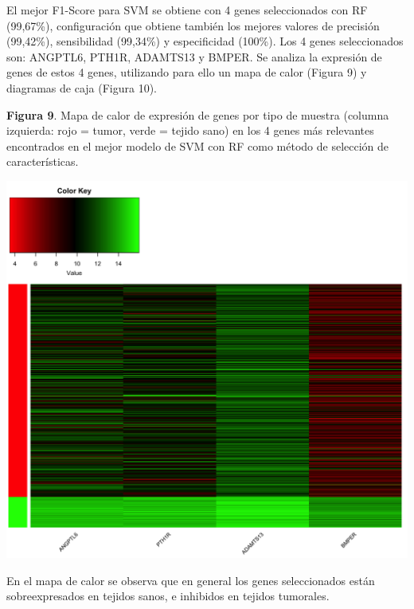 El mejor F1-Score para SVM se obtiene con 4 genes seleccionados con RF (99,67\%), configuración que obtiene también los mejores valores de precisión (99,42\%), sensibilidad (99,34\%) y especificidad (100\%). Los 4 genes seleccionados son: ANGPTL6, PTH1R, ADAMTS13 y BMPER. Se analiza la expresión de genes de estos 4 genes, utilizando para ello un mapa de calor (Figura 9) y diagramas de caja (Figura 10).

\newpage
\begin{center}
\textbf{Figura 9}. Mapa de calor de expresión de genes por tipo de muestra (columna izquierda: rojo = tumor, verde = tejido sano) en los 4 genes más relevantes encontrados en el mejor modelo de SVM con RF como método de selección de características.
\end{center}
\begin{center}
	\includegraphics[width=1\textwidth]{figuras/09_higado_biclase_16_svm_heatmap_mejor_metodo.png} 
\end{center}

En el mapa de calor se observa que en general los genes seleccionados están sobreexpresados en tejidos sanos, e inhibidos en tejidos tumorales.

